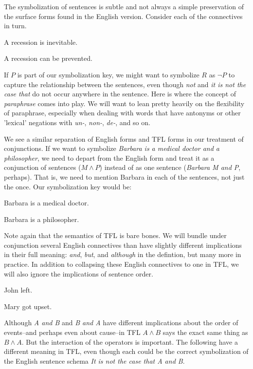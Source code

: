 The symbolization of sentences is subtle and not always a simple preservation
of the surface forms found in the English version. Consider each of the
connectives in turn.

\begin{argument}
\item[R:] A recession is inevitable.
\item[P:] A recession can be prevented.
\end{argument}

If $P$ is part of our symbolization key, we might want to symbolize $R$ as
$\lnot P$ to capture the relationship between the sentences, even though
\emph{not} and \emph{it is not the case that} do not occur anywhere in
the sentence. Here is where the concept of \emph{paraphrase} comes into
play. We will want to lean pretty heavily on the flexibility of paraphrase,
especially when dealing with words that have antonyms or other 'lexical'
negations with \emph{un-}, \emph{non-}, \emph{de-}, and so on. 

We see a similar separation of English forms and TFL forms in our
treatment of conjunctions. If we want to symbolize \emph{Barbara is a medical
  doctor and a philosopher}, we need to depart from the English form and treat
it as a conjunction of sentences ($M \land P$) instead of as one sentence
(\emph{Barbara M and P}, perhaps). That is, we need to mention Barbara in
each of the sentences, not just the once. Our symbolization key would be:

\begin{argument}
\item[M:] Barbara is a medical doctor.
\item[P:] Barbara is a philosopher.  
\end{argument}

Note again that the semantics of TFL is bare bones. We will bundle under
conjunction several English connectives than have slightly different
implications in their full meaning: \emph{and}, \emph{but}, and
\emph{although} in the defintion, but many more in practice. In addition to
collapsing these English connectives to one in TFL, we will also ignore the
implications of sentence order. 

\begin{argument}
\item[A:] John left.
\item[B:] Mary got upset.
\end{argument}

Although \emph{A and B} and \emph{B and A} have different implications
about the order of events--and perhaps even about cause--in TFL $A \land B$
says the exact same thing as $B \land A$. But the interaction of the operators
is important. The following have a different meaning in TFL, even though each
could be the correct symbolization of the English sentence schema \emph{It
  is not the case that A and B}.

